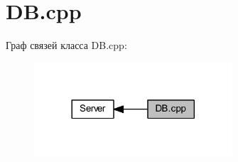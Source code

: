 \hypertarget{group__dbcpp}{}\section{D\+B.\+cpp}
\label{group__dbcpp}
Граф связей класса D\+B.\+cpp\+:\nopagebreak
\begin{figure}[H]
\begin{center}
\leavevmode
\includegraphics[width=209pt]{group__dbcpp}
\end{center}
\end{figure}
